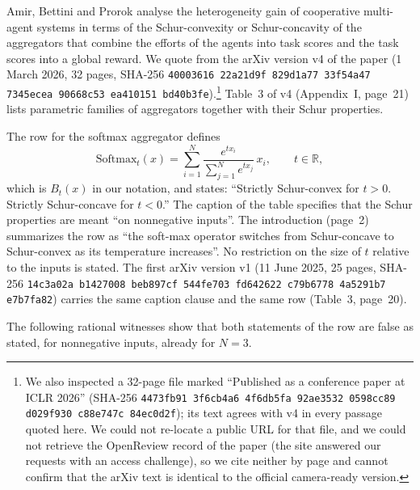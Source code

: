 \documentclass[11pt,a4paper]{article}
\theoremstyle{plain}
\theoremstyle{definition}
\newcommand{\R}{\mathbb{R}}
\begin{document}
\begin{sloppypar}
Amir, Bettini and Prorok \cite{AmirBettiniProrok2026} analyse the heterogeneity gain of cooperative multi-agent systems in terms of the Schur-convexity or Schur-concavity of the aggregators that combine the efforts of the agents into task scores and the task scores into a global reward. We quote from the arXiv version v4 of the paper (1 March 2026, 32 pages, SHA-256 \texttt{40003616 22a21d9f 829d1a77 33f54a47 7345ecea 90668c53 ea410151 bd40b3fe}).\footnote{We also inspected a 32-page file marked ``Published as a conference paper at ICLR 2026'' (SHA-256 \texttt{4473fb91 3f6cb4a6 4f6db5fa 92ae3532 0598cc89 d029f930 c88e747c 84ec0d2f}); its text agrees with v4 in every passage quoted here. We could not re-locate a public URL for that file, and we could not retrieve the OpenReview record of the paper (the site answered our requests with an access challenge), so we cite neither by page and cannot confirm that the arXiv text is identical to the official camera-ready version.} Table~3 of v4 (Appendix~I, page~21) lists parametric families of aggregators together with their Schur properties.
\end{sloppypar}
The row for the softmax aggregator defines
\[
\mathrm{Softmax}_t(x)=\sum_{i=1}^{N}\frac{e^{tx_i}}{\sum_{j=1}^{N}e^{tx_j}}\,x_i,\qquad t\in\R,
\]
which is $B_t(x)$ in our notation, and states: ``Strictly Schur-convex for $t>0$. Strictly Schur-concave for $t<0$.'' The caption of the table specifies that the Schur properties are meant ``on nonnegative inputs''. The introduction (page~2) summarizes the row as ``the soft-max operator switches from Schur-concave to Schur-convex as its temperature increases''. No restriction on the size of $t$ relative to the inputs is stated. The first arXiv version v1 (11 June 2025, 25 pages, SHA-256 \texttt{14c3a02a b1427008 beb897cf 544fe703 fd642622 c79b6778 4a5291b7 e7b7fa82}) carries the same caption clause and the same row (Table~3, page~20).

The following rational witnesses show that both statements of the row are false as stated, for nonnegative inputs, already for $N=3$.
\end{document}
